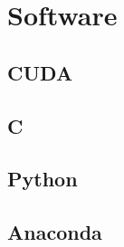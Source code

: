 \section{Software}\label{soft}
\subsection{CUDA}\label{soft:sec:cuda}
\subsection{C}\label{soft:sec:c}
\subsection{Python}\label{soft:sec:py}
\subsection{Anaconda}\label{soft:sec:ana}
